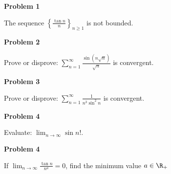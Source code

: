 \documentclass{article}
\begin{document}
\begin{center}
    \textbf{Problem 1}
\end{center}
\begin{problem}{}
    The sequence $\displaystyle \left\{ \frac{\tan n}{n} \right\}_{n \geq 1}$ is not bounded. 
\end{problem}

\vspace{.5cm}
\begin{center}
    \textbf{Problem 2}
\end{center}
\begin{problem}{}
    Prove or disprove: $\displaystyle \sum_{n = 1}^\infty \frac{\sin (n \sqrt{n})}{\sqrt{n}}$ is convergent. 
\end{problem}

\vspace{.5cm}
\begin{center}
    \textbf{Problem 3}
\end{center}
\begin{problem}{}
    Prove or disprove: $\displaystyle \sum_{n = 1}^\infty \frac{1}{n^3 \sin^2 n}$ is convergent. 
\end{problem}

\vspace{.5cm}
\begin{center}
    \textbf{Problem 4}
\end{center}
\begin{problem}{}
    Evaluate: $\displaystyle \lim_{n \to \infty} \sin n!$. 
\end{problem}

\vspace{.5cm}
\begin{center}
    \textbf{Problem 4}
\end{center}
\begin{problem}{}
    If $\displaystyle \lim_{n \to \infty} \frac{\tan n}{n^a} = 0$, find the minimum value $a \in \R_+$
\end{problem}
\end{document}
